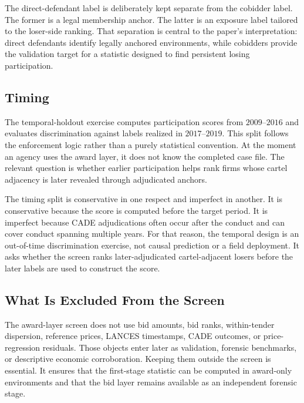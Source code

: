 The direct-defendant label is deliberately kept separate from the
cobidder label. The former is a legal membership anchor. The
latter is an exposure label tailored to the loser-side ranking.
That separation is central to the paper's interpretation: direct
defendants identify legally anchored environments, while
cobidders provide the validation target for a statistic designed
to find persistent losing participation.

\subsection{Timing}
\label{app:timing_submission}

The temporal-holdout exercise computes participation scores from
$2009$--$2016$ and evaluates discrimination against labels
realized in $2017$--$2019$. This split follows the enforcement
logic rather than a purely statistical convention. At the moment
an agency uses the award layer, it does not know the completed
case file. The relevant question is whether earlier participation
helps rank firms whose cartel adjacency is later revealed through
adjudicated anchors.

The timing split is conservative in one respect and imperfect in
another. It is conservative because the score is computed before
the target period. It is imperfect because CADE adjudications
often occur after the conduct and can cover conduct spanning
multiple years. For that reason, the temporal design is an
out-of-time discrimination exercise, not causal prediction or a
field deployment. It asks whether the screen ranks
later-adjudicated cartel-adjacent losers before the later labels
are used to construct the score.

\subsection{What Is Excluded From the Screen}
\label{app:excluded_screen_submission}

The award-layer screen does not use bid amounts, bid ranks,
within-tender dispersion, reference prices, LANCES timestamps,
CADE outcomes, or price-regression residuals. Those objects enter
later as validation, forensic benchmarks, or descriptive economic
corroboration. Keeping them outside the screen is essential. It
ensures that the first-stage statistic can be computed in
award-only environments and that the bid layer remains available
as an independent forensic stage.

